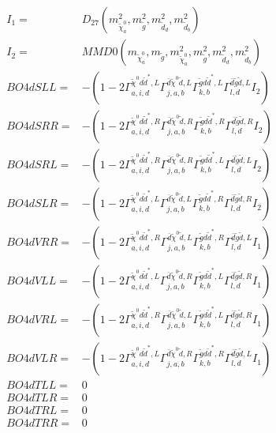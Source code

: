 \documentclass[A4,landscape]{article}
\begin{document}
\begin{align} 
I_1 = & D_{27}(m^2_{\tilde{\chi}^0_{{a}}}, m^2_{\tilde{g}}, m^2_{\tilde{d}_{{d}}}, m^2_{\tilde{d}_{{b}}}) \\ 
I_2 = & MMD0(m_{\tilde{\chi}^0_{{a}}}, m_{\tilde{g}}, m^2_{\tilde{\chi}^0_{{a}}}, m^2_{\tilde{g}}, m^2_{\tilde{d}_{{d}}}, m^2_{\tilde{d}_{{b}}}) \\ 
  BO4dSLL= & -(1
-
2 \Gamma^{\tilde{\chi}^0 d \tilde{d}^*,L}_{a, i, d} \Gamma^{\bar{d}\tilde{\chi}^0 \tilde{d} ,L}_{j, a, b} \Gamma^{\tilde{g} d \tilde{d}^*,L}_{k, b} \Gamma^{\bar{d}\tilde{g} \tilde{d} ,L}_{l, d} I_2) \\ 
  BO4dSRR= & -(1
-
2 \Gamma^{\tilde{\chi}^0 d \tilde{d}^*,R}_{a, i, d} \Gamma^{\bar{d}\tilde{\chi}^0 \tilde{d} ,R}_{j, a, b} \Gamma^{\tilde{g} d \tilde{d}^*,R}_{k, b} \Gamma^{\bar{d}\tilde{g} \tilde{d} ,R}_{l, d} I_2) \\ 
  BO4dSRL= & -(1
-
2 \Gamma^{\tilde{\chi}^0 d \tilde{d}^*,R}_{a, i, d} \Gamma^{\bar{d}\tilde{\chi}^0 \tilde{d} ,R}_{j, a, b} \Gamma^{\tilde{g} d \tilde{d}^*,L}_{k, b} \Gamma^{\bar{d}\tilde{g} \tilde{d} ,L}_{l, d} I_2) \\ 
  BO4dSLR= & -(1
-
2 \Gamma^{\tilde{\chi}^0 d \tilde{d}^*,L}_{a, i, d} \Gamma^{\bar{d}\tilde{\chi}^0 \tilde{d} ,L}_{j, a, b} \Gamma^{\tilde{g} d \tilde{d}^*,R}_{k, b} \Gamma^{\bar{d}\tilde{g} \tilde{d} ,R}_{l, d} I_2) \\ 
  BO4dVRR= & -(1
-
2 \Gamma^{\tilde{\chi}^0 d \tilde{d}^*,R}_{a, i, d} \Gamma^{\bar{d}\tilde{\chi}^0 \tilde{d} ,L}_{j, a, b} \Gamma^{\tilde{g} d \tilde{d}^*,R}_{k, b} \Gamma^{\bar{d}\tilde{g} \tilde{d} ,L}_{l, d} I_1) \\ 
  BO4dVLL= & -(1
-
2 \Gamma^{\tilde{\chi}^0 d \tilde{d}^*,L}_{a, i, d} \Gamma^{\bar{d}\tilde{\chi}^0 \tilde{d} ,R}_{j, a, b} \Gamma^{\tilde{g} d \tilde{d}^*,L}_{k, b} \Gamma^{\bar{d}\tilde{g} \tilde{d} ,R}_{l, d} I_1) \\ 
  BO4dVRL= & -(1
-
2 \Gamma^{\tilde{\chi}^0 d \tilde{d}^*,R}_{a, i, d} \Gamma^{\bar{d}\tilde{\chi}^0 \tilde{d} ,L}_{j, a, b} \Gamma^{\tilde{g} d \tilde{d}^*,L}_{k, b} \Gamma^{\bar{d}\tilde{g} \tilde{d} ,R}_{l, d} I_1) \\ 
  BO4dVLR= & -(1
-
2 \Gamma^{\tilde{\chi}^0 d \tilde{d}^*,L}_{a, i, d} \Gamma^{\bar{d}\tilde{\chi}^0 \tilde{d} ,R}_{j, a, b} \Gamma^{\tilde{g} d \tilde{d}^*,R}_{k, b} \Gamma^{\bar{d}\tilde{g} \tilde{d} ,L}_{l, d} I_1) \\ 
  BO4dTLL= & 0 \\ 
  BO4dTLR= & 0 \\ 
  BO4dTRL= & 0 \\ 
  BO4dTRR= & 0 \\ 
\end{align} 
\end{document}
